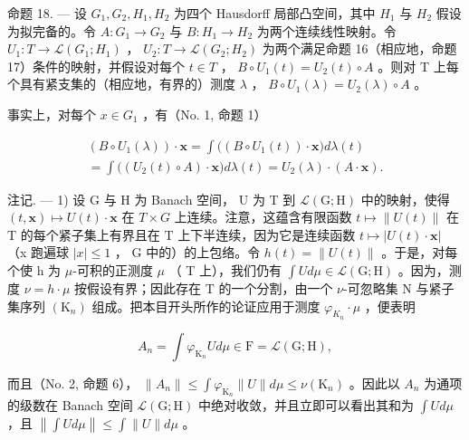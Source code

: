 命题 18. --- 设 \(G_{1}, G_{2}, H_{1}, H_{2}\) 为四个 Hausdorff 局部凸空间，其中 \(H_{1}\) 与 \(H_{2}\) 假设为拟完备的。令 \(A : G_{1} \to G_{2}\) 与 \(B : H_{1} \to H_{2}\) 为两个连续线性映射。令 \(U_{1} : T \to \mathcal{L}(G_{1}; H_{1})\) ， \(U_{2} : T \to \mathcal{L}(G_{2}; H_{2})\) 为两个满足命题 16（相应地，命题 17）条件的映射，并假设对每个 \(t \in T\) ， \(B \circ U_{1}(t) = U_{2}(t) \circ A\) 。则对 T 上每个具有紧支集的（相应地，有界的）测度 \(\lambda\) ， \(B \circ U_{1}(\lambda) = U_{2}(\lambda) \circ A\) 。

事实上，对每个 \(x \in G_{1}\) ，有（No. 1, 命题 1）

\[
\begin{array}{c} \left(B \circ U _ {1} (\lambda)\right) \cdot \mathbf {x} = \int \Big (\left(B \circ U _ {1} (t)\right) \cdot \mathbf {x} \Big) d \lambda (t) \\ = \int \Big (\left(U _ {2} (t) \circ A\right) \cdot \mathbf {x} \Big) d \lambda (t) = U _ {2} (\lambda) \cdot (A \cdot \mathbf {x}). \end{array}
\]

注记. --- 1) 设 G 与 H 为 Banach 空间， U 为 T 到 \(\mathcal{L}(\mathrm{G};\mathrm{H})\) 中的映射，使得 \((t,\mathbf{x})\mapsto U(t)\cdot\mathbf{x}\) 在 \(T\times G\) 上连续。注意，这蕴含有限函数 \(t\mapsto\|U(t)\|\) 在 T 的每个紧子集上有界且在 T 上下半连续，因为它是连续函数 \(t \mapsto |U(t) \cdot \mathbf{x}|\) （x 跑遍球 \(|x| \leqslant 1\) ， G 中的）的上包络。令 \(h(t) = \|U(t)\|\) 。于是，对每个使 h 为 \(\mu\)-可积的正测度 \(\mu\) （ T 上），我们仍有 \(\int U d\mu \in \mathcal{L}(\mathrm{G};\mathrm{H})\) 。因为，测度 \(\nu = h \cdot \mu\) 按假设有界；因此存在 T 的一个分割，由一个 \(\nu\)-可忽略集 N 与紧子集序列 \((\mathrm{K}_{n})\) 组成。把本目开头所作的论证应用于测度 \(\varphi_{K_{n}} \cdot \mu\) ，便表明

\[
A _ {n} = \int \varphi_ {\mathrm{K} _ {n}} U d \mu \in \mathrm{F} = \mathcal {L} (\mathrm{G}; \mathrm{H}),
\]

而且（No. 2, 命题 6）， \(\| A_n\| \leqslant \int \varphi_{\mathrm{K}_n}\| U\| d\mu \leqslant \nu (\mathrm{K}_n)\) 。因此以 \(A_{n}\) 为通项的级数在 Banach 空间 \(\mathcal{L}(\mathrm{G};\mathrm{H})\) 中绝对收敛，并且立即可以看出其和为 \(\int Ud\mu\) ，且 \(\left\| \int Ud\mu \right\| \leqslant \int \| U\| d\mu\) 。

